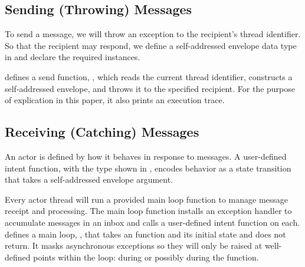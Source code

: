\documentclass[sigplan,screen]{acmart}
\begin{document}
\subsection{Sending (Throwing) Messages}
\label{sec:sending-throwing}


To send a message, we will throw an exception to the recipient's thread
identifier.
%
So that the recipient may respond, we define a self-addressed envelope data
type in  and declare the required instances.


 defines a send function, ,
which reads the current thread identifier, constructs a self-addressed
envelope, and throws it to the specified recipient.
%
For the purpose of explication in this paper, it also prints an execution trace.


\subsection{Receiving (Catching) Messages}
\label{sec:receiving-catching}


An actor is defined by how it behaves in response to messages.
%
A user-defined intent function, with the type  shown in
,
encodes behavior as a state transition that takes a self-addressed envelope
argument.


Every actor thread will run a provided main loop function to manage message
receipt and processing.
%
The main loop function installs an exception handler to accumulate messages in
an inbox and calls a user-defined intent function on each.
%
 defines a main loop, , that
takes an  function and its initial state and does not return.
%
It masks asynchronous exceptions so they will only be raised at well-defined
points within the loop: during  or possibly during the
 function.
\end{document}

